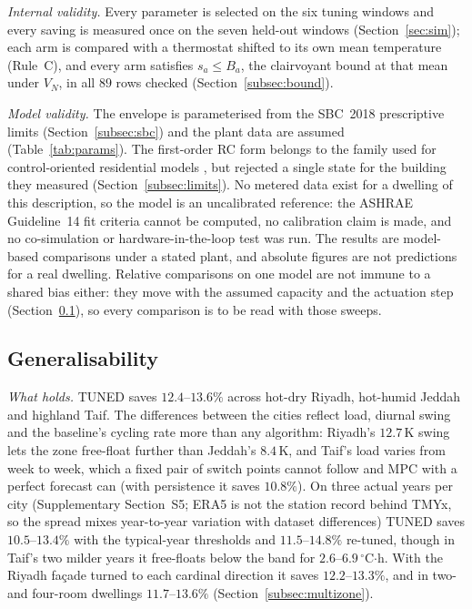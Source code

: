 \documentclass[pdflatex,sn-mathphys-num,iicol]{sn-jnl}
\theoremstyle{thmstyleone}\newtheorem{proposition}{Proposition}\newtheorem{corollary}{Corollary}
\theoremstyle{thmstyletwo}\newtheorem{remark}{Remark}\newtheorem{observation}{Observation}
\theoremstyle{thmstylethree}\newtheorem{definition}{Definition}
\begin{document}
\emph{Internal validity.} Every parameter is selected on the six tuning windows and every saving is measured once on the seven held-out windows (Section~\ref{sec:sim}); each arm is compared with a thermostat shifted to its own mean temperature (Rule~C), and every arm satisfies $s_a\le B_a$, the clairvoyant bound at that mean under $V_N$, in all $89$ rows checked (Section~\ref{subsec:bound}).

\emph{Model validity.} The envelope is parameterised from the SBC~2018 prescriptive limits (Section~\ref{subsec:sbc}) and the plant data are assumed (Table~\ref{tab:params}). The first-order RC form belongs to the family used for control-oriented residential models \citep{Wang2021RC,Shi2022}, but \citet{Bacher2011} rejected a single state for the building they measured (Section~\ref{subsec:limits}). No metered data exist for a dwelling of this description, so the model is an uncalibrated reference: the ASHRAE Guideline~14 fit criteria cannot be computed, no calibration claim is made, and no co-simulation or hardware-in-the-loop test was run. The results are model-based comparisons under a stated plant, and absolute figures are not predictions for a real dwelling. Relative comparisons on one model are not immune to a shared bias either: they move with the assumed capacity and the actuation step (Section~\ref{subsec:generalisability}), so every comparison is to be read with those sweeps.

\subsection{Generalisability}
\label{subsec:generalisability}

\emph{What holds.} TUNED saves $12.4$--$13.6\%$ across hot-dry Riyadh, hot-humid Jeddah and highland Taif. The differences between the cities reflect load, diurnal swing and the baseline's cycling rate more than any algorithm: Riyadh's $12.7\,$K swing lets the zone free-float further than Jeddah's $8.4\,$K, and Taif's load varies from week to week, which a fixed pair of switch points cannot follow and MPC with a perfect forecast can (with persistence it saves $10.8\%$). On three actual years per city (Supplementary Section~S5; ERA5 is not the station record behind TMYx, so the spread mixes year-to-year variation with dataset differences) TUNED saves $10.5$--$13.4\%$ with the typical-year thresholds and $11.5$--$14.8\%$ re-tuned, though in Taif's two milder years it free-floats below the band for $2.6$--$6.9\,^\circ$C$\cdot$h. With the Riyadh façade turned to each cardinal direction it saves $12.2$--$13.3\%$, and in two- and four-room dwellings $11.7$--$13.6\%$ (Section~\ref{subsec:multizone}).
\end{document}
